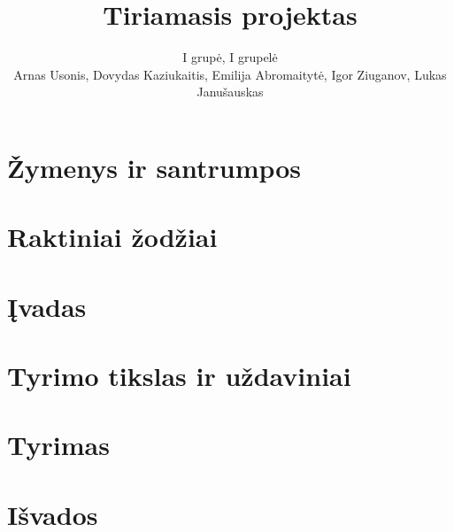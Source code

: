 \documentclass{article}
\title{\textbf{Tiriamasis projektas}}
\author{I grupė, I grupelė \\
        \small Arnas Usonis, Dovydas Kaziukaitis, Emilija Abromaitytė, Igor Ziuganov, Lukas Janušauskas}
\date{ }
\begin{document}
\maketitle
\normalsize
\tableofcontents
\pagebreak

\section{Žymenys ir santrumpos}


\section{Raktiniai žodžiai}


\section{Įvadas}


\section{Tyrimo tikslas ir uždaviniai}


\section{Tyrimas}


\section{Išvados}

\end{document}
